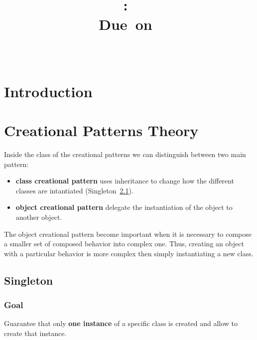 \documentclass{article}
\title{
\vspace{2in}
\textmd{\textbf{\hmwkClass:\ \hmwkTitle}}\\
\normalsize\vspace{0.1in}\small{Due\ on\ \hmwkDueDate}\\
\vspace{0.1in}\large{\textit{\hmwkClassInstructor\ \hmwkClassTime}}
\vspace{3in}
}
\author{\textbf{\hmwkAuthorName}}
\date{} %
\begin{document}
\maketitle



\newpage
\tableofcontents
\newpage



\section{Introduction}


\section{Creational Patterns Theory}
Inside the class of the creational patterns we can distinguish between two main pattern:
\begin{itemize}
\item \textbf{class creational pattern} uses inheritance to change how the different classes are intantiated (Singleton~\ref{Singleton}).
\item \textbf{object creational pattern} delegate the instantiation of the object to another object.
\end{itemize}
The object creational pattern become important when it is necessary to compose a smaller set of composed behavior into complex one. Thus, creating an object with a particular behavior is more complex then simply instantiating a new class.

\subsection{Singleton}
\label{Singleton}
\subsubsection{Goal}
Guarantee that only \textbf{one instance} of a specific class is created and allow to create that instance.
\end{document}
